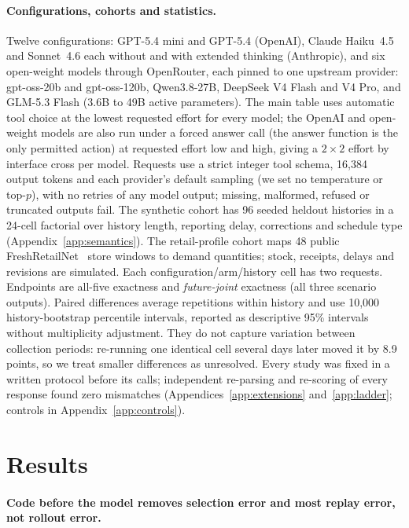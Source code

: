 \documentclass{article}
\begin{document}
\paragraph{Configurations, cohorts and statistics.}
Twelve configurations: GPT-5.4 mini and GPT-5.4 (OpenAI), Claude Haiku~4.5 and Sonnet~4.6
each without and with extended thinking (Anthropic), and six open-weight models through
OpenRouter, each pinned to one upstream provider: gpt-oss-20b and gpt-oss-120b, Qwen3.8-27B,
DeepSeek V4 Flash and V4 Pro, and GLM-5.3 Flash (3.6B to 49B active parameters). The main
table uses automatic tool choice at the lowest requested effort for every model; the OpenAI
and open-weight models are also run under a forced answer call (the answer function is the
only permitted action) at requested effort low and high, giving a $2\times2$ effort by
interface cross per model. Requests use a strict integer tool schema, 16,384 output tokens and each provider's default
sampling (we set no temperature or top-$p$), with no retries of any model output; missing, malformed, refused or truncated outputs fail.
The synthetic cohort has 96 seeded heldout histories in a 24-cell factorial over history length, reporting
delay, corrections and schedule type (Appendix~\ref{app:semantics}). The retail-profile cohort maps 48 public
FreshRetailNet~\citep{wang2025freshretailnet} store windows to demand quantities; stock,
receipts, delays and revisions are simulated. Each configuration/arm/history cell has two
requests. Endpoints are all-five exactness and \emph{future-joint} exactness (all three
scenario outputs). Paired differences average repetitions within history and use 10,000
history-bootstrap percentile intervals, reported as descriptive 95\% intervals without
multiplicity adjustment. They do not capture variation between collection periods: re-running
one identical cell several days later moved it by 8.9 points, so we treat smaller
differences as unresolved. Every study was fixed in a written protocol before its calls;
independent re-parsing and re-scoring of every response found zero mismatches
(Appendices~\ref{app:extensions} and~\ref{app:ladder}; controls in Appendix~\ref{app:controls}).

\section{Results}

\paragraph{Code before the model removes selection error and most replay error, not rollout error.}

\end{document}
